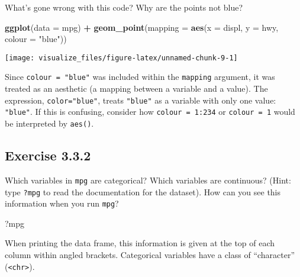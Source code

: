 \documentclass[]{book}
\newenvironment{Shaded}{\begin{snugshade}}{\end{snugshade}}
\newcommand{\DataTypeTok}[1]{\textcolor[rgb]{0.13,0.29,0.53}{#1}}
\newcommand{\KeywordTok}[1]{\textcolor[rgb]{0.13,0.29,0.53}{\textbf{#1}}}
\newcommand{\NormalTok}[1]{#1}
\newcommand{\OperatorTok}[1]{\textcolor[rgb]{0.81,0.36,0.00}{\textbf{#1}}}
\newcommand{\StringTok}[1]{\textcolor[rgb]{0.31,0.60,0.02}{#1}}
\theoremstyle{plain}
\theoremstyle{remark}
\begin{document}
What's gone wrong with this code? Why are the points not blue?

\begin{Shaded}
\begin{Highlighting}[]
\KeywordTok{ggplot}\NormalTok{(}\DataTypeTok{data =}\NormalTok{ mpg) }\OperatorTok{+}
\StringTok{  }\KeywordTok{geom_point}\NormalTok{(}\DataTypeTok{mapping =} \KeywordTok{aes}\NormalTok{(}\DataTypeTok{x =}\NormalTok{ displ, }\DataTypeTok{y =}\NormalTok{ hwy, }\DataTypeTok{colour =} \StringTok{"blue"}\NormalTok{))}
\end{Highlighting}
\end{Shaded}

\begin{center}\texttt{[image: visualize\_files/figure-latex/unnamed-chunk-9-1]} \end{center}

Since \texttt{colour\ =\ "blue"} was included within the
\texttt{mapping} argument, it was treated as an aesthetic (a mapping
between a variable and a value). The expression, \texttt{color="blue"},
treats \texttt{"blue"} as a variable with only one value:
\texttt{"blue"}. If this is confusing, consider how
\texttt{colour\ =\ 1:234} or \texttt{colour\ =\ 1} would be interpreted
by \texttt{aes()}.

\hypertarget{exercise-3.3.2}{%
\subsection*{\texorpdfstring{Exercise
{3.3.2}}{Exercise 3.3.2}}\label{exercise-3.3.2}}

Which variables in \texttt{mpg} are categorical? Which variables are
continuous? (Hint: type \texttt{?mpg} to read the documentation for the
dataset). How can you see this information when you run \texttt{mpg}?

\begin{Shaded}
\begin{Highlighting}[]
\NormalTok{?mpg}
\end{Highlighting}
\end{Shaded}

When printing the data frame, this information is given at the top of
each column within angled brackets. Categorical variables have a class
of ``character'' (\texttt{\textless{}chr\textgreater{}}).
\end{document}
